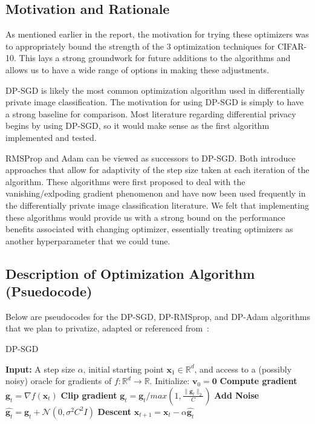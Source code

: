 \subsection{Motivation and Rationale}\label{subsec:motivation-and-rationale}

As mentioned earlier in the report, the motivation for trying these optimizers was to appropriately bound the strength of the 3 optimization techniques for CIFAR-10. 
This lays a strong groundwork for future additions to the algorithms and allows us to have a wide range of options in making these adjustments. 

DP-SGD is likely the most common optimization algorithm used in differentially private image classification. The motivation for using DP-SGD is simply to have a strong 
baseline for comparison. Most literature regarding differential privacy begins by using DP-SGD, so it would make sense as the first algorithm implemented and tested.

RMSProp and Adam can be viewed as successors to DP-SGD. Both introduce approaches that allow for adaptivity of the step size taken at each iteration of the algorithm. These algorithms
were first proposed to deal with the vanishing/exlpoding gradient phenomenon and have now been used frequently in the differentially private image classification literature. We felt that
implementing these algorithms would provide us with a strong bound on the performance benefits associated with changing optimizer, essentially treating optimizers as another hyperparameter
that we could tune.

\subsection{Description of Optimization Algorithm (Psuedocode)}\label{subsec:algorithm-description}

Below are pseudocodes for the DP-SGD, DP-RMSprop, and DP-Adam algorithms that we plan to privatize, adapted or referenced from~\cite{DBLP:journals/corr/abs-1807-06766}:
\begin{algorithm}
    \caption{DP-SGD}
    \label{alg:sgd}
    \begin{algorithmic}[1]
        \State \textbf{Input:} A step size $\alpha$, initial starting point $\mathbf{x}_1 \in \mathbb{R}^d$,
        and access to a (possibly noisy) oracle for gradients of $f : \mathbb{R}^d \rightarrow \mathbb{R}$.
            \State Initialize: $\mathbf{v}_0 = \mathbf{0}$
                \State \textbf{Compute gradient}
                \State $\mathbf{g}_t = \nabla f(\mathbf{x}_t)$
                \State \textbf{Clip gradient}
                \State $\mathbf{g}_t = \mathbf{g}_t/max(1, \frac{\lVert \mathbf{g}_t \rVert_{2} }{C})$
                \State \textbf{Add Noise}
                \State $\hat{\mathbf{g}_t} = \mathbf{g}_t + \mathcal{N}(0,\sigma^{2}C^{2}I)$
                \State \textbf{Descent}
                \State $\mathbf{x}_{t+1} = \mathbf{x}_t - \alpha \hat{\mathbf{g}_t}$
            \EndFor
        \EndFunction
    \end{algorithmic}
\end{algorithm}
\vspace{-1cm}


